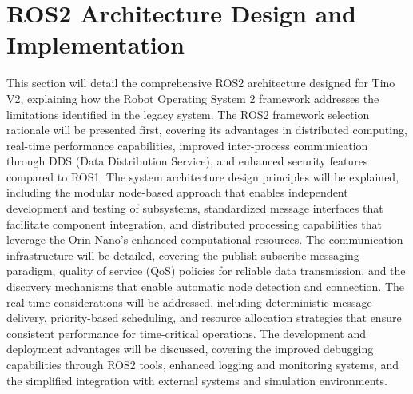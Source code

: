 \section{ROS2 Architecture Design and Implementation}
This section will detail the comprehensive ROS2 architecture designed for Tino V2, explaining how the Robot Operating System 2 framework addresses the limitations identified in the legacy system. The ROS2 framework selection rationale will be presented first, covering its advantages in distributed computing, real-time performance capabilities, improved inter-process communication through DDS (Data Distribution Service), and enhanced security features compared to ROS1. The system architecture design principles will be explained, including the modular node-based approach that enables independent development and testing of subsystems, standardized message interfaces that facilitate component integration, and distributed processing capabilities that leverage the Orin Nano's enhanced computational resources. The communication infrastructure will be detailed, covering the publish-subscribe messaging paradigm, quality of service (QoS) policies for reliable data transmission, and the discovery mechanisms that enable automatic node detection and connection. The real-time considerations will be addressed, including deterministic message delivery, priority-based scheduling, and resource allocation strategies that ensure consistent performance for time-critical operations. The development and deployment advantages will be discussed, covering the improved debugging capabilities through ROS2 tools, enhanced logging and monitoring systems, and the simplified integration with external systems and simulation environments.


